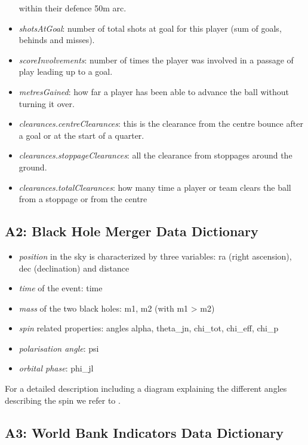 \begin{itemize}
  within their defence 50m arc.
\item
  \emph{shotsAtGoal}: number of total shots at goal for this player (sum
  of goals, behinds and misses).
\item
  \emph{scoreInvolvements}: number of times the player was involved in a
  passage of play leading up to a goal.
\item
  \emph{metresGained}: how far a player has been able to advance the
  ball without turning it over.
\item
  \emph{clearances.centreClearances}: this is the clearance from the
  centre bounce after a goal or at the start of a quarter.
\item
  \emph{clearances.stoppageClearances}: all the clearance from stoppages
  around the ground.
\item
  \emph{clearances.totalClearances}: how many time a player or team
  clears the ball from a stoppage or from the centre
\end{itemize}

\hypertarget{a2-black-hole-merger-data-dictionary}{%
\subsection{A2: Black Hole Merger Data
Dictionary}\label{a2-black-hole-merger-data-dictionary}}

\begin{itemize}
\tightlist
\item
  \emph{position} in the sky is characterized by three variables: ra
  (right ascension), dec (declination) and distance
\item
  \emph{time} of the event: time
\item
  \emph{mass} of the two black holes: m1, m2 (with m1 \textgreater{} m2)
\item
  \emph{spin} related properties: angles alpha, theta\_jn, chi\_tot,
  chi\_eff, chi\_p
\item
  \emph{polarisation angle}: psi
\item
  \emph{orbital phase}: phi\_jl
\end{itemize}

For a detailed description including a diagram explaining the different
angles describing the spin we refer to \citet{Smith:2016qas}.

\hypertarget{a3-world-bank-indicators-data-dictionary}{%
\subsection{A3: World Bank Indicators Data
Dictionary}\label{a3-world-bank-indicators-data-dictionary}}

